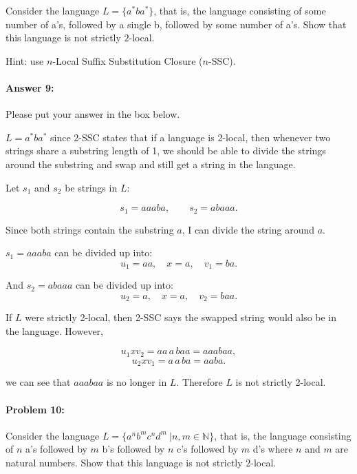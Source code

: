 \documentclass[10pt]{article}
\newenvironment{AnswerBox}{\begin{mdframed}[style=simple]}{\end{mdframed}}
\begin{document}
Consider the language $L=\{a^* b a^*\}$, that is, the language
consisting of some number of a's, followed by a single b, followed by
some number of a's. Show that this language is not strictly
$2$-local.

 Hint: use $n$-Local Suffix Substitution Closure ($n$-SSC).

\paragraph{Answer 9:} Please put your answer in the box below.


\begin{AnswerBox}%

    $L = a^* b a^*$ since 2-SSC states that if a language is 2-local, then whenever two strings share a substring length of 1, we should be able to divide the strings around the substring and swap and still get a string in the language.
    
    Let $s_1$ and $s_2$ be strings in $L$:
    
    \[ s_1 = aaaba, \qquad s_2 = abaaa. \]
    
    Since both strings contain the substring $a$, I can divide the string around $a$.
    
    $s_1 = aaaba$ can be divided up into:
    \[ u_1 = aa, \quad x = a, \quad v_1 = ba. \]
    
    And $s_2 = abaaa$ can be divided up into:
    \[ u_2 = a, \quad x = a, \quad v_2 = baa. \]
    
    If $L$ were strictly 2-local, then 2-SSC says the swapped string would also be in the language. However,
    
    \[ u_1 x v_2 = aa \, a \, baa = aaabaa, \]
    \[ u_2 x v_1 = a \, a \, ba = aaba. \]
    
    we can see that $aaabaa$ is no longer in $L$. Therefore $L$ is not strictly 2-local.

    
\end{AnswerBox}%


\hrulefill %

\paragraph{Problem 10:}

Consider the language
$L= \{a^n b^m c^n d^m\ | n, m \in \mathbb{N} \}$, that is, the
language consisting of $n$ a's followed by $m$ b's followed by $n$ c's
followed by $m$ d's where $n$ and $m$ are
natural numbers. Show that this language is not strictly $2$-local.
\end{document}
